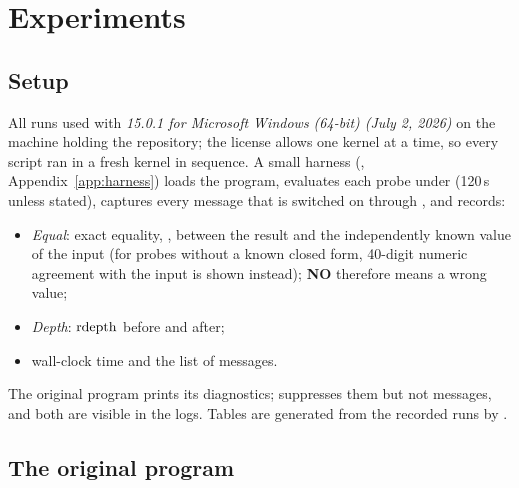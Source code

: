 \section{Experiments}
\label{sec:experiments}

\subsection{Setup}
\label{sec:setup}
All runs used  with \emph{15.0.1 for Microsoft Windows
(64-bit) (July 2, 2026)} on the machine holding the repository; the license
allows one kernel at a time, so every script ran in a fresh kernel in
sequence. A small harness (, Appendix~\ref{app:harness}) loads
the program, evaluates each probe under  (120\,s unless
stated), captures every message that is switched on through
, and records:
\begin{itemize}
\item \emph{Equal}: exact equality, ,
      between the result and the independently known value of the input (for
      probes without a known closed form, 40-digit numeric agreement with the
      input is shown instead); \textbf{NO} therefore means a wrong value;
\item \emph{Depth}: $\operatorname{rdepth}$ before and after;
\item wall-clock time and the list of messages.
\end{itemize}
The original program prints its diagnostics;  suppresses them but
not messages, and both are visible in the logs. Tables are generated from the
recorded runs by .

\subsection{The original program}
\label{sec:exporig}

